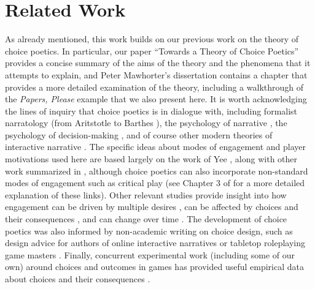 \documentclass[arts,article,submit,moreauthors,pdftex,10pt,a4paper]{Definitions/mdpi}
\begin{document}
\section{Related Work}

As already mentioned, this work builds on our previous work on the theory of choice poetics.
%
In particular, our paper ``Towards a Theory of Choice Poetics'' \citep{mawhorter2014towards} provides a concise summary of the aims of the theory and the phenomena that it attempts to explain, and Peter Mawhorter's dissertation \citeyear{mawhorter2016artificial} contains a chapter that provides a more detailed examination of the theory, including a walkthrough of the \emph{Papers, Please} example that we also present here.
%
It is worth acknowledging the lines of inquiry that choice poetics is in dialogue with, including formalist narratology (from Aritstotle \citeyear{aristotle1917poetics} to Barthes \citeyear{barthes1975introduction}), the psychology of narrative \citep{tversky1981framing,green2000role,mar2008function,zunshine2006why}, the psychology of decision-making \citep{mellers1997decision,schwartz2002maximizing}, and of course other modern theories of interactive narrative \citep{aarseth1997cybertext,murray1997hamlet,ryan1991possible,tosca2000pragmatics,mateas2001preliminary,frasca2003ludologists,lindley2005story}.
%
The specific ideas about modes of engagement and player motivations used here are based largely on the work of Yee \citeyear{yee2006motivations}, along with other work summarized in \citep{hamari2014player}, although choice poetics can also incorporate non-standard modes of engagement such as critical play \citep{flanagan2009critical} (see Chapter 3 of \citep{mawhorter2016artificial} for a more detailed explanation of these links).
%
Other relevant studies provide insight into how engagement can be driven by multiple desires \citep{lindley2005story}, can be affected by choices and their consequences \citep{mallon2005stand}, and can change over time \citep{lange2014youre}.
%
The development of choice poetics was also informed by non-academic writing on choice design, such as design advice for authors of online interactive narratives \citep{choiceofgames2010rules} or tabletop roleplaying game masters \citep{laws2001robin}.
%
Finally, concurrent experimental work (including some of our own) around choices and outcomes in games has provided useful empirical data about choices and their consequences \citep{fendt2012achieving,cardonarivera2014foreseeing,mawhorter2015generating,iten2018choosing}.
\end{document}
